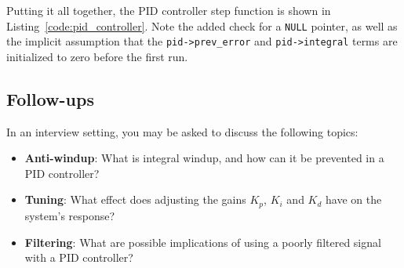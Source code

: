 \documentclass[main.tex]{subfiles}
\begin{document}
\noindent Putting it all together, the PID controller step function is shown in Listing~\ref{code:pid_controller}. Note the added check for a \texttt{NULL} pointer, as well as the implicit assumption that the \texttt{pid->prev\_error} and \texttt{pid->integral} terms are initialized to zero before the first run.



\subsection{Follow-ups}
In an interview setting, you may be asked to discuss the following topics:
\begin{itemize}
    \item \textbf{Anti-windup}: What is integral windup, and how can it be prevented in a PID controller?
    \item \textbf{Tuning}: What effect does adjusting the gains $K_p$, $K_i$ and $K_d$ have on the system's response?
    \item \textbf{Filtering}: What are possible implications of using a poorly filtered signal with a PID controller?
\end{itemize}
\end{document}
